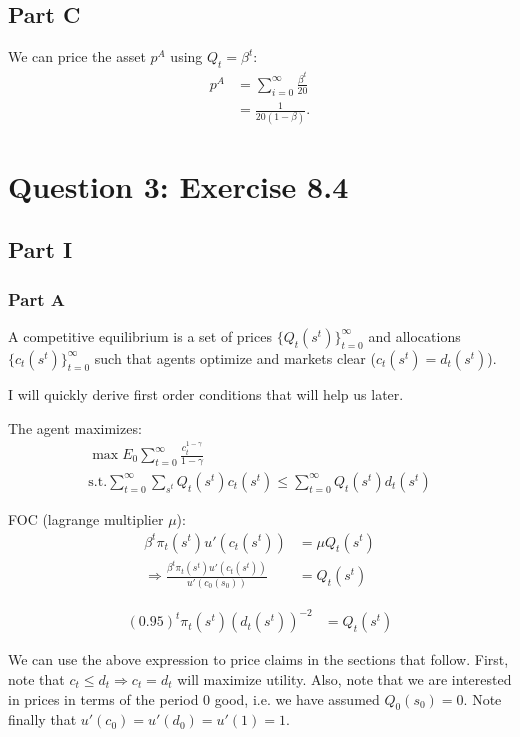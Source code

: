 \documentclass[11pt]{article} %
\begin{document}
\subsection{Part C}

We can price the asset $p^A$ using $Q_t = \beta^t$:
\begin{align*}
p^A &= \sum_{i=0}^{\infty}\frac{\beta^t}{20}\\
&= \frac{1}{20(1-\beta)}.
\end{align*}

\section{Question 3: Exercise 8.4}
\subsection{Part I}
\subsubsection{Part A}
A competitive equilibrium is a set of prices $\{Q_t(s^t)\}_{t=0}^{\infty}$ and allocations $\{c_t(s^t)\}_{t=0}^{\infty}$ such that agents optimize and markets clear ($c_t(s^t) =d_t(s^t)$).


I will quickly derive first order conditions that will help us later.

The agent maximizes:
\begin{align*}
\max E_0 \sum_{t=0}^{\infty}\frac{c_t^{1-\gamma}}{1-\gamma}\\
\text{s.t.} \sum_{t=0}^{\infty}\sum_{s^t}Q_t(s^t)c_t(s^t) \leq \sum_{t=0}^{\infty}Q_t(s^t)d_t(s^t)
\end{align*}

FOC (lagrange multiplier $\mu$):
\begin{align*}
\beta^t\pi_t(s^t)u'(c_t(s^t)) &= \mu Q_t(s^t)\\
\Rightarrow \frac{\beta^t \pi_t(s^t)u'(c_t(s^t))}{u'(c_0(s_0))} &= Q_{t}(s^t)
\end{align*}

\begin{align}
(0.95)^t \pi_t(s^t)(d_t(s^t))^{-2} &=  Q_{t}(s^t) \label{Q}
\end{align}

We can use the above expression to price claims in the sections that follow. First, note that $c_t\leq d_t \Rightarrow c_t = d_t$ will maximize utility. Also, note that we are interested in prices in terms of the period $0$ good, i.e. we have assumed $Q_0(s_0) = 0.$ Note finally that $u'(c_0) = u'(d_0) = u'(1) = 1.$
\end{document}
